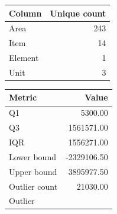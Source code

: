 \begin{tabular}{lr}
\toprule
Column & Unique count \\
\midrule
Area & 243 \\
Item & 14 \\
Element & 1 \\
Unit & 3 \\
\bottomrule
\end{tabular}

\begin{tabular}{lr}
\toprule
Metric & Value \\
\midrule
Q1 & 5300.00 \\
Q3 & 1561571.00 \\
IQR & 1556271.00 \\
Lower bound & -2329106.50 \\
Upper bound & 3895977.50 \\
Outlier count & 21030.00 \\
Outlier %
\bottomrule
\end{tabular}

